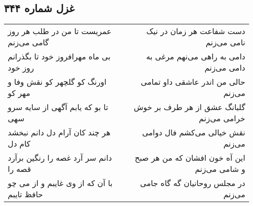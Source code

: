 \begin{center}
\section*{غزل شماره ۳۴۴}
\label{sec:sh344}
\begin{longtable}{l p{0.5cm} r}
عمریست تا من در طلب هر روز گامی می‌زنم
&&
دست شفاعت هر زمان در نیک نامی می‌زنم
\\
بی ماه مهرافروز خود تا بگذرانم روز خود
&&
دامی به راهی می‌نهم مرغی به دامی می‌زنم
\\
اورنگ کو گلچهر کو نقش وفا و مهر کو
&&
حالی من اندر عاشقی داو تمامی می‌زنم
\\
تا بو که یابم آگهی از سایه سرو سهی
&&
گلبانگ عشق از هر طرف بر خوش خرامی می‌زنم
\\
هر چند کان آرام دل دانم نبخشد کام دل
&&
نقش خیالی می‌کشم فال دوامی می‌زنم
\\
دانم سر آرد غصه را رنگین برآرد قصه را
&&
این آه خون افشان که من هر صبح و شامی می‌زنم
\\
با آن که از وی غایبم و از می چو حافظ تایبم
&&
در مجلس روحانیان گه گاه جامی می‌زنم
\\
\end{longtable}
\end{center}
